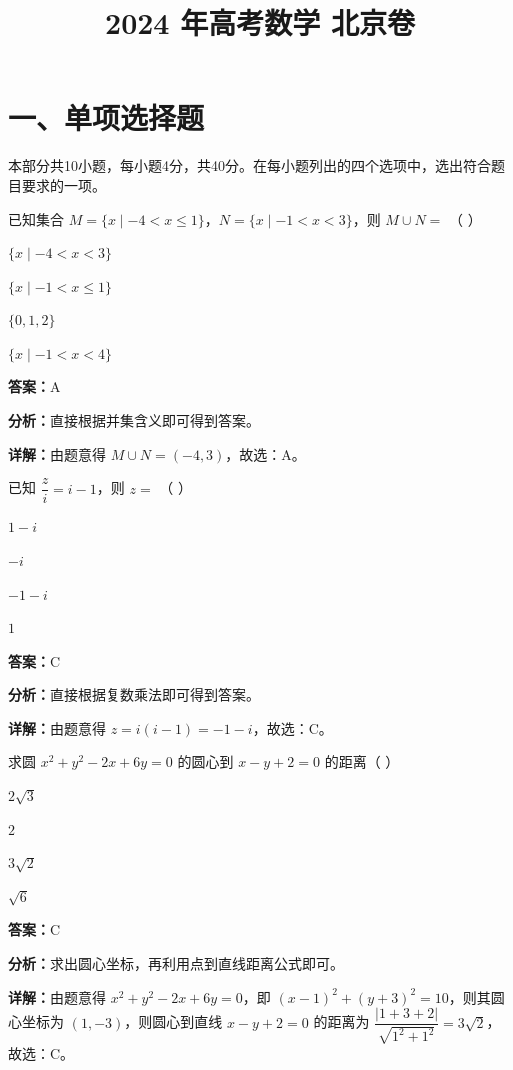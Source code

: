 ﻿\title{2024 年高考数学 北京卷}
\date{}
\maketitle

\section*{一、单项选择题}
本部分共10小题，每小题4分，共40分。在每小题列出的四个选项中，选出符合题目要求的一项。

\begin{question}[points=4]
已知集合 $M = \{ x \mid -4 < x \leq 1 \}$，$N = \{x \mid -1 < x < 3\}$，则 $M \cup N =$ （ ）
\begin{choices}
  \item $\{x \mid -4 < x < 3\}$
  \item $\{x \mid -1 < x \leq 1\}$
  \item $\{0,1,2\}$
  \item $\{x \mid -1 < x < 4\}$
\end{choices}
\begin{solution}
\textbf{答案：}A

\textbf{分析：}直接根据并集含义即可得到答案。

\textbf{详解：}由题意得 $M \cup N = (-4,3)$，故选：A。
\end{solution}
\end{question}

\begin{question}[points=4]
已知 $\dfrac{z}{i} = i-1$，则 $z=$ （ ）
\begin{choices}
  \item $1-i$
  \item $-i$
  \item $-1-i$
  \item $1$
\end{choices}
\begin{solution}
\textbf{答案：}C

\textbf{分析：}直接根据复数乘法即可得到答案。

\textbf{详解：}由题意得 $z = i(i-1) = -1-i$，故选：C。
\end{solution}
\end{question}

\begin{question}[points=4]
求圆 $x^2 + y^2 - 2x + 6y = 0$ 的圆心到 $x - y + 2 = 0$ 的距离（ ）
\begin{choices}
  \item $2\sqrt{3}$
  \item $2$
  \item $3\sqrt{2}$
  \item $\sqrt{6}$
\end{choices}
\begin{solution}
\textbf{答案：}C

\textbf{分析：}求出圆心坐标，再利用点到直线距离公式即可。

\textbf{详解：}由题意得 $x^2 + y^2 - 2x + 6y = 0$，即 $(x-1)^2 + (y+3)^2 = 10$，则其圆心坐标为 $(1,-3)$，则圆心到直线 $x-y+2=0$ 的距离为 $\dfrac{|1+3+2|}{\sqrt{1^2+1^2}} = 3\sqrt{2}$，故选：C。
\end{solution}
\end{question}

